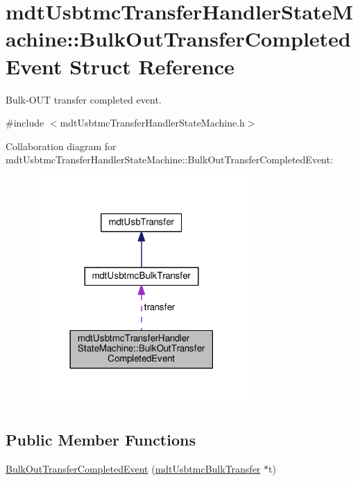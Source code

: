 \hypertarget{structmdt_usbtmc_transfer_handler_state_machine_1_1_bulk_out_transfer_completed_event}{\section{mdt\-Usbtmc\-Transfer\-Handler\-State\-Machine\-:\-:Bulk\-Out\-Transfer\-Completed\-Event Struct Reference}
\label{structmdt_usbtmc_transfer_handler_state_machine_1_1_bulk_out_transfer_completed_event}
}


Bulk-\/\-O\-U\-T transfer completed event.  




{\ttfamily \#include $<$mdt\-Usbtmc\-Transfer\-Handler\-State\-Machine.\-h$>$}



Collaboration diagram for mdt\-Usbtmc\-Transfer\-Handler\-State\-Machine\-:\-:Bulk\-Out\-Transfer\-Completed\-Event\-:\nopagebreak
\begin{figure}[H]
\begin{center}
\leavevmode
\includegraphics[width=234pt]{structmdt_usbtmc_transfer_handler_state_machine_1_1_bulk_out_transfer_completed_event__coll__graph}
\end{center}
\end{figure}
\subsection*{Public Member Functions}
\begin{DoxyCompactItemize}
\item 
\hyperlink{structmdt_usbtmc_transfer_handler_state_machine_1_1_bulk_out_transfer_completed_event_a05c7b65a448169627134c8b3d63edc9e}{Bulk\-Out\-Transfer\-Completed\-Event} (\hyperlink{classmdt_usbtmc_bulk_transfer}{mdt\-Usbtmc\-Bulk\-Transfer} $\ast$t)
\end{DoxyCompactItemize}
